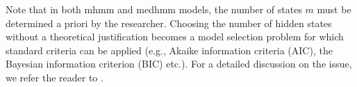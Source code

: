 Note that in both \ac{mhmm} and \ac{medhmm} models, the number of states $m$ must be determined a priori by the researcher. Choosing the number of hidden states without a theoretical justification becomes a model selection problem for which standard criteria can be applied (e.g., Akaike information criteria (AIC), the Bayesian information criterion (BIC) etc.). For a detailed discussion on the issue, we refer the reader to \cite{de_haan_rietdijk_use_2017}. 









